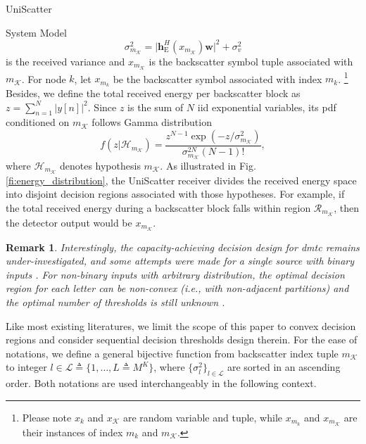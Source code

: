 \documentclass[journal]{IEEEtran}
\newtheorem{remark}{Remark}
\begin{document}
\begin{section}{UniScatter}
\begin{subsection}{System Model}
		\begin{equation}
			\sigma_{m_{\mathcal{K}}}^2 = \lvert \boldsymbol{h}_{\mathrm{E}}^H(x_{m_{\mathcal{K}}}) \boldsymbol{w} \rvert^2 + \sigma_v^2
			\label{eq:receive_variance}
		\end{equation}
		is the received variance and $x_{m_\mathcal{K}}$ is the backscatter symbol tuple associated with $m_{\mathcal{K}}$.
		For node $k$, let $x_{m_k}$ be the backscatter symbol associated with index $m_k$.%
		\footnote{
			Please note $x_k$ and $x_{\mathcal{K}}$ are random variable and tuple, while $x_{m_k}$ and $x_{m_{\mathcal{K}}}$ are their instances of index $m_k$ and $m_{\mathcal{K}}$.
		}
		Besides, we define the total received energy per backscatter block as $z=\sum_{n=1}^N \lvert y[n] \rvert^2$.
		Since $z$ is the sum of $N$ \gls{iid} exponential variables, its \gls{pdf} conditioned on $m_{\mathcal{K}}$ follows Gamma distribution
		\begin{equation}
			f(z|\mathcal{H}_{m_{\mathcal{K}}}) = \frac{z^{N-1} \exp(-z/\sigma_{m_{\mathcal{K}}}^2)}{\sigma_{m_{\mathcal{K}}}^{2N} (N-1)!},
			\label{eq:energy_distribution}
		\end{equation}
		where $\mathcal{H}_{m_{\mathcal{K}}}$ denotes hypothesis $m_{\mathcal{K}}$.
		As illustrated in Fig. \ref{fi:energy_distribution}, the UniScatter receiver divides the received energy space into disjoint decision regions associated with those hypotheses.
		For example, if the total received energy during a backscatter block falls within region $\mathcal{R}_{m_{\mathcal{K}}}$, then the detector output would be $x_{m_{\mathcal{K}}}$.
		\begin{remark}
			Interestingly, the capacity-achieving decision design for \gls{dmtc} remains under-investigated, and some attempts were made for a single source with binary inputs \cite{Qian2019b,Nguyen2021b}.
			For non-binary inputs with arbitrary distribution, the optimal decision region for each letter can be non-convex (i.e., with non-adjacent partitions) and the optimal number of thresholds is still unknown \cite{Nguyen2018,Nguyen2021}.
		\end{remark}
		Like most existing literatures, we limit the scope of this paper to convex decision regions and consider sequential decision thresholds design therein.
		For the ease of notations, we define a general bijective function from backscatter index tuple $m_{\mathcal{K}}$ to integer $l \in \mathcal{L} \triangleq \{1,\ldots,L \triangleq M^K\}$, where $\{\sigma_l^2\}_{l \in \mathcal{L}}$ are sorted in an ascending order.
		Both notations are used interchangeably in the following context.

\end{subsection}
\end{section}
\end{document}
